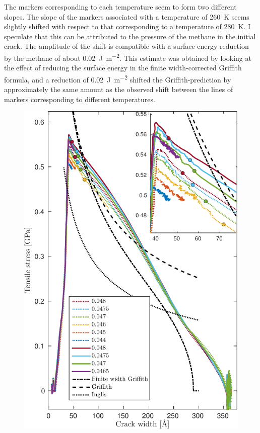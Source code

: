  The markers corresponding to each temperature seem to form two different slopes. The slope of the markers associated with a temperature of \SI{260}{\kelvin} seems slightly shifted with respect to that corresponding to a temperature of \SI{280}{\kelvin}. I speculate that this can be attributed to the pressure of the methane in the initial crack. The amplitude of the shift is compatible with a surface energy reduction by the methane of about \SI{0.02}{\joule\per\meter\squared}. This estimate was obtained by looking at the effect of reducing the surface energy in the finite width-corrected Griffith formula, and a reduction of \SI{0.02}{\joule\per\meter\squared} shifted the Griffith-prediction by approximately the same amount as the observed shift between the lines of markers corresponding to different temperatures.
%
\begin{figure}
\centering
\includegraphics[width=12cm]{../figures/thesis/stress_area_lefm.pdf}

\end{figure}
